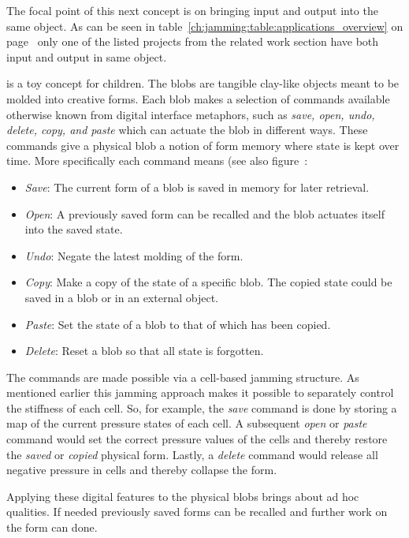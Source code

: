 The focal point of this next concept is on bringing input and output into the same object.
As can be seen in table~\ref{ch:jamming:table:applications_overview} on page~\pageref{ch:jamming:table:applications_overview} only one of the listed projects from the related work section have both input and output in same object. 

 is a toy concept for children.
The blobs are tangible clay-like objects meant to be molded into creative forms.
Each blob makes a selection of commands available otherwise known from digital interface metaphors, such as \emph{save, open, undo, delete, copy, and paste} which can actuate the blob in different ways.
These commands give a physical blob a notion of form memory where state is kept over time.
More specifically each command means (see also figure~:
\begin{itemize}
	\item{\emph{Save}: The current form of a blob is saved in memory for later retrieval.}
	\item{\emph{Open}: A previously saved form can be recalled and the blob actuates itself into the saved state.}
	\item{\emph{Undo}: Negate the latest molding of the form.}
	\item{\emph{Copy}: Make a copy of the state of a specific blob. The copied state could be saved in a blob or in an external object.}
	\item{\emph{Paste}: Set the state of a blob to that of which has been copied.} 
	\item{\emph{Delete}: Reset a blob so that all state is forgotten.} 
\end{itemize}
The commands are made possible via a cell-based jamming structure.
As mentioned earlier this jamming approach makes it possible to separately control the stiffness of each cell.
So, for example, the \emph{save} command is done by storing a map of the current pressure states of each cell.
A subsequent \emph{open} or \emph{paste} command would set the correct pressure values of the cells and thereby restore the \emph{saved} or \emph{copied} physical form.
Lastly, a \emph{delete} command would release all negative pressure in cells and thereby collapse the form.

Applying these digital features to the physical blobs brings about ad hoc qualities.
If needed previously saved forms can be recalled and further work on the form can done.

